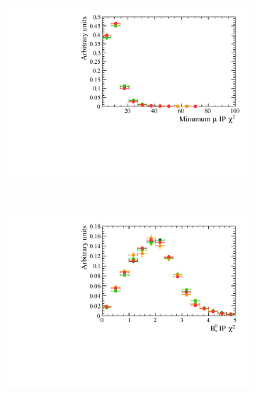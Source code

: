 \begin{figure}
 \begin{subfigure}[b]{0.48\textwidth}
        \includegraphics[width=\textwidth]{./Figs/Appendix1/bkgnd_muIPS.pdf}
    \end{subfigure}
    ~ %
    \begin{subfigure}[b]{0.48\textwidth}
       \includegraphics[width=\textwidth]{./Figs/Appendix1/bkgnd_IPS.pdf}
    \end{subfigure}






\end{figure}

